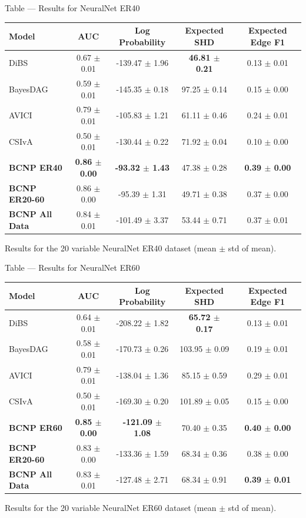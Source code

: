 \documentclass[aspectratio=169,10pt]{beamer}
\begin{document}
\begin{frame}{Table --- Results for NeuralNet ER40}
\centering
\scriptsize
\begin{tabular}{lcccc}
\toprule
\textbf{Model} & \textbf{AUC} & \textbf{Log Probability} & \textbf{Expected SHD} & \textbf{Expected Edge F1} \\
\midrule
DiBS & 0.67 $\pm$ 0.01 & -139.47 $\pm$ 1.96 & \textbf{46.81 $\pm$ 0.21} & 0.13 $\pm$ 0.01 \\
BayesDAG & 0.59 $\pm$ 0.01 & -145.35 $\pm$ 0.18 & 97.25 $\pm$ 0.14 & 0.15 $\pm$ 0.00 \\
AVICI & 0.79 $\pm$ 0.01 & -105.83 $\pm$ 1.21 & 61.11 $\pm$ 0.46 & 0.24 $\pm$ 0.01 \\
CSIvA & 0.50 $\pm$ 0.01 & -130.44 $\pm$ 0.22 & 71.92 $\pm$ 0.04 & 0.10 $\pm$ 0.00 \\
\textbf{BCNP ER40} & \textbf{0.86 $\pm$ 0.00} & \textbf{-93.32 $\pm$ 1.43} & 47.38 $\pm$ 0.28 & \textbf{0.39 $\pm$ 0.00} \\
\textbf{BCNP ER20-60} & 0.86 $\pm$ 0.00 & -95.39 $\pm$ 1.31 & 49.71 $\pm$ 0.38 & 0.37 $\pm$ 0.00 \\
\textbf{BCNP All Data} & 0.84 $\pm$ 0.01 & -101.49 $\pm$ 3.37 & 53.44 $\pm$ 0.71 & 0.37 $\pm$ 0.01 \\
\bottomrule
\end{tabular}

\vspace{0.3cm}
{\footnotesize Results for the 20 variable NeuralNet ER40 dataset (mean $\pm$ std of mean).}
\end{frame}

\begin{frame}{Table --- Results for NeuralNet ER60}
\centering
\scriptsize
\begin{tabular}{lcccc}
\toprule
\textbf{Model} & \textbf{AUC} & \textbf{Log Probability} & \textbf{Expected SHD} & \textbf{Expected Edge F1} \\
\midrule
DiBS & 0.64 $\pm$ 0.01 & -208.22 $\pm$ 1.82 & \textbf{65.72 $\pm$ 0.17} & 0.13 $\pm$ 0.01 \\
BayesDAG & 0.58 $\pm$ 0.01 & -170.73 $\pm$ 0.26 & 103.95 $\pm$ 0.09 & 0.19 $\pm$ 0.01 \\
AVICI & 0.79 $\pm$ 0.01 & -138.04 $\pm$ 1.36 & 85.15 $\pm$ 0.59 & 0.29 $\pm$ 0.01 \\
CSIvA & 0.50 $\pm$ 0.01 & -169.30 $\pm$ 0.20 & 101.89 $\pm$ 0.05 & 0.15 $\pm$ 0.00 \\
\textbf{BCNP ER60} & \textbf{0.85 $\pm$ 0.00} & \textbf{-121.09 $\pm$ 1.08} & 70.40 $\pm$ 0.35 & \textbf{0.40 $\pm$ 0.00} \\
\textbf{BCNP ER20-60} & 0.83 $\pm$ 0.00 & -133.36 $\pm$ 1.59 & 68.34 $\pm$ 0.36 & 0.38 $\pm$ 0.00 \\
\textbf{BCNP All Data} & 0.83 $\pm$ 0.01 & -127.48 $\pm$ 2.71 & 68.34 $\pm$ 0.91 & \textbf{0.39 $\pm$ 0.01} \\
\bottomrule
\end{tabular}

\vspace{0.3cm}
{\footnotesize Results for the 20 variable NeuralNet ER60 dataset (mean $\pm$ std of mean).}
\end{frame}
\end{document}
